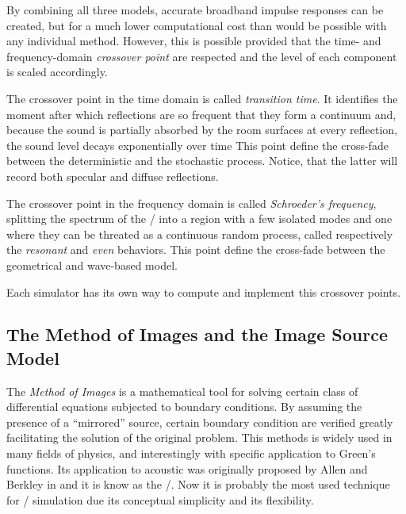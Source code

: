 By combining all three models, accurate broadband impulse responses can be created,
but for a much lower computational cost than would be possible with any individual method.
However, this is possible provided that the time- and frequency-domain
\textit{crossover point} are respected and the level of each component is scaled accordingly.


The crossover point in the time domain is called \textit{transition time}.
It identifies the moment after which reflections are so frequent that they form a continuum and, because the sound is partially absorbed by the room surfaces at every reflection, the sound level decays exponentially over time \cite{Badeau2019common}
This point define the cross-fade between the deterministic and the stochastic process.
Notice, that the latter will record both specular and diffuse reflections.

The crossover point in the frequency domain is called \textit{Schroeder's frequency}, splitting the
spectrum of the \RIR/ into a region with a few isolated modes and one where they can be threated as a
continuous random process, called respectively the \textit{resonant} and \textit{even} behaviors.
This point define the cross-fade between the geometrical and wave-based model.

Each simulator has its own way to compute and implement this crossover points.


\subsection{The Method of Images and the Image Source Model}

The \textit{Method of Images} is a mathematical tool for solving certain class of differential equations subjected to boundary conditions.
By assuming the presence of a ``mirrored'' source, certain boundary condition are verified greatly facilitating the solution of the original problem.
This methods is widely used in many fields of physics, and interestingly with specific application to Green's functions.
Its application to acoustic was originally proposed by Allen and Berkley in \cite{allen1979image} and it is know as the \ISMf/.
Now it is probably the most used technique for \RIR/ simulation due its conceptual simplicity and its flexibility.

